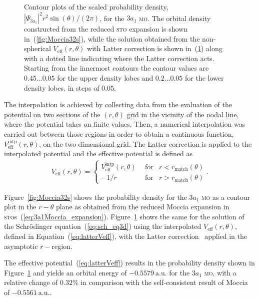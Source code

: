 \begin{figure}
\begin{subfigure}[b]{0.275\linewidth}
    \caption{}\label{fig:intp32s}
  \end{subfigure}
  \caption{Contour plots of the scaled probability density,
    $|\Psi_{\mathrm{3a_{1}}}|^{2}r^{2}\sin(\theta)/(2\pi)$, for the
    $3a_{1}$ \textsc{mo}. The orbital density constructed from
    the reduced \textsc{sto} expansion is shown
    in~(\ref{fig:Moccia32s}), while the solution obtained from the
    non-spherical $V_{\mathrm{eff}}(r,\theta)$ with Latter correction
    is shown in~(\ref{fig:intp32s}) along with a dotted line
    indicating where the Latter correction acts. Starting from the
    innermost contours the contour values are $0.45\dots 0.05$ for the
    upper density lobes and $0.2\dots 0.05$ for the lower density
    lobes, in steps of $0.05$.}
  \label{fig:density_contours}
\end{figure}

The interpolation is achieved by collecting data from the evaluation
of the potential on two sections of the $(r,\theta)$ grid in the
vicinity of the nodal line, where the potential takes on finite
values. Then, a numerical interpolation was carried out between those
regions in order to obtain a continuous function,
$V_{\mathrm{eff}}^{\mathrm{intp}}(r,\theta)$, on the two-dimensional
grid. The Latter correction is applied to the interpolated potential
and the effective potential is defined as
%
\begin{eqnarray}
  V_{\mathrm{eff}}(r,\theta) = \left\{
  \begin{split}
    V_{\mathrm{eff}}^{\mathrm{intp}}(r,\theta)\
    & \mathrm{~for} & r < r_{\mathrm{match}}(\theta) \\
    -1/r\ & \mathrm{~for} &  r > r_{\mathrm{match}}(\theta)
  \end{split}
  \right.
  .
\label{eq:latterVeff}
\end{eqnarray}
%

Figure~\ref{fig:Moccia32s} shows the probability density for the
$3a_{1}$ \textsc{mo} as a contour plot in the $r-\theta$ plane as
obtained from the reduced Moccia expansion in
\textsc{sto}s~(\ref{eq:3a1Moccia_expansion}). Figure~\ref{fig:intp32s}
shows the same for the solution of the Schr\"{o}dinger
equation~(\ref{eq:sch_eq3d}) using the interpolated
$V_{\mathrm{eff}}(r,\theta)$, defined in
Equation~(\ref{eq:latterVeff}), with the Latter
correction~\cite{LatterCor_1955} applied in the asymptotic $r-$region.

The effective potential~(\ref{eq:latterVeff}) results in the
probability density shown in Figure~\ref{fig:intp32s} and yields an
orbital energy of $-0.5579\ \mathrm{a.u.}$ for the $3a_{1}$
\textsc{mo}, with a relative change of $0.32\%$ in comparison with the
self-consistent result of Moccia~\cite{Moccia_1964} of
$-0.5561\ \mathrm{a.u.}$.

